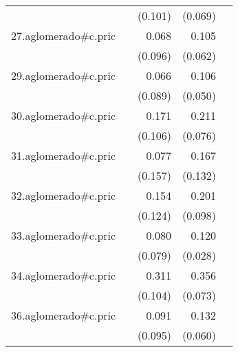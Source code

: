 {\begin{longtable}{l*{4}{D{.}{.}{-1}}}
            &                     &     (0.101)         &     (0.069)         &                     \\
\addlinespace
27.aglomerado#c.pric&                     &       0.068         &       0.105         &                     \\
            &                     &     (0.096)         &     (0.062)         &                     \\
\addlinespace
29.aglomerado#c.pric&                     &       0.066         &       0.106\sym{*}  &                     \\
            &                     &     (0.089)         &     (0.050)         &                     \\
\addlinespace
30.aglomerado#c.pric&                     &       0.171         &       0.211\sym{**} &                     \\
            &                     &     (0.106)         &     (0.076)         &                     \\
\addlinespace
31.aglomerado#c.pric&                     &       0.077         &       0.167         &                     \\
            &                     &     (0.157)         &     (0.132)         &                     \\
\addlinespace
32.aglomerado#c.pric&                     &       0.154         &       0.201\sym{*}  &                     \\
            &                     &     (0.124)         &     (0.098)         &                     \\
\addlinespace
33.aglomerado#c.pric&                     &       0.080         &       0.120\sym{***}&                     \\
            &                     &     (0.079)         &     (0.028)         &                     \\
\addlinespace
34.aglomerado#c.pric&                     &       0.311\sym{**} &       0.356\sym{***}&                     \\
            &                     &     (0.104)         &     (0.073)         &                     \\
\addlinespace
36.aglomerado#c.pric&                     &       0.091         &       0.132\sym{*}  &                     \\
            &                     &     (0.095)         &     (0.060)         &                     \\

\end{longtable}}
